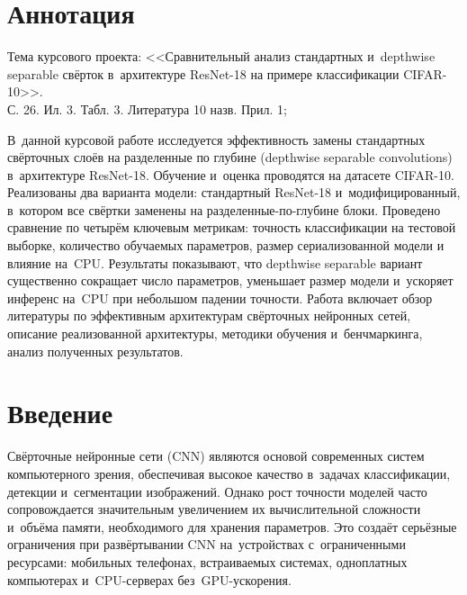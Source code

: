 \thispagestyle{empty}

\newpage
\section*{Аннотация}

\begin{sloppypar}
    Тема курсового проекта: <<Сравнительный анализ стандартных и~depthwise separable свёрток в~архитектуре ResNet-18 на примере классификации CIFAR-10>>. \\
    С. 26. Ил. 3. Табл. 3. Литература 10 назв. Прил. 1;

    В~данной курсовой работе исследуется эффективность замены
    стандартных свёрточных слоёв на разделенные по глубине (depthwise separable convolutions)
    в~архитектуре ResNet-18. Обучение и~оценка проводятся на датасете
    CIFAR-10. Реализованы два варианта модели: стандартный ResNet-18
    и~модифицированный, в~котором все свёртки
    заменены на разделенные-по-глубине блоки. Проведено сравнение по четырём ключевым
    метрикам: точность классификации на тестовой выборке, количество обучаемых параметров, размер сериализованной
    модели и влияние на~CPU. Результаты показывают, что
    depthwise separable вариант существенно сокращает число параметров,
    уменьшает размер модели и~ускоряет
    инференс на~CPU при небольшом падении точности. Работа
    включает обзор литературы по эффективным архитектурам свёрточных
    нейронных сетей, описание реализованной архитектуры, методики
    обучения и~бенчмаркинга, анализ полученных результатов.
\end{sloppypar}

\thispagestyle{empty}

\newpage
\tableofcontents
\newpage

\section*{Введение}

Свёрточные нейронные сети (CNN) являются основой современных систем компьютерного зрения, обеспечивая высокое качество в~задачах классификации, детекции и~сегментации изображений. Однако рост точности моделей часто сопровождается значительным увеличением их вычислительной сложности и~объёма памяти, необходимого для хранения параметров. Это создаёт серьёзные ограничения при развёртывании CNN на~устройствах с~ограниченными ресурсами: мобильных телефонах, встраиваемых системах, одноплатных компьютерах и~CPU-серверах без~GPU-ускорения.

